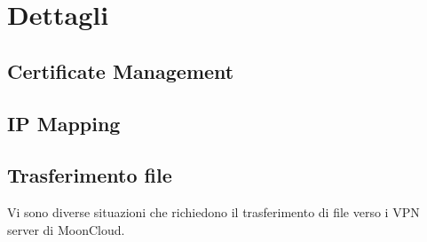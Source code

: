 \section{Dettagli}

\subsection{Certificate Management}

\subsection{IP Mapping}

\subsection{Trasferimento file}
Vi sono diverse situazioni che richiedono il trasferimento di file
verso i VPN server di MoonCloud.
